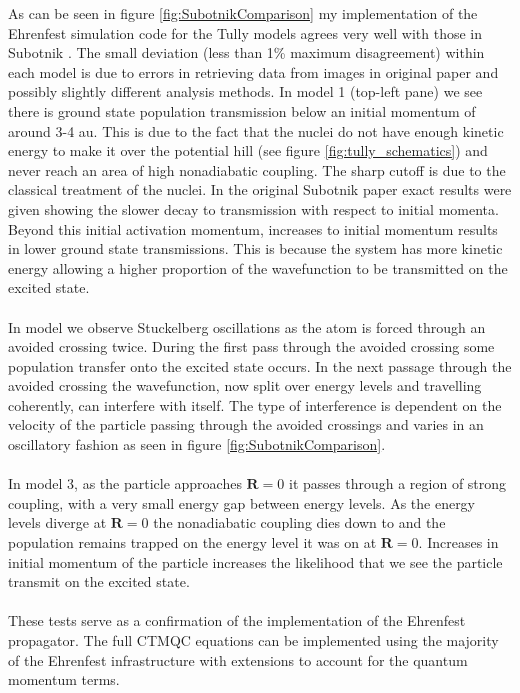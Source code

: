 As can  be seen in figure \ref{fig:SubotnikComparison} my implementation of the Ehrenfest simulation code for the Tully models agrees very well with those in Subotnik \cite{SubotnikMomentumEhrenfest}. The small deviation (less than 1\% maximum disagreement) within each model is due to errors in retrieving data from images in original paper and possibly slightly different analysis methods. In model 1 (top-left pane) we see there is  ground state population transmission below an initial momentum of around 3-4 au. This is due to the fact that the nuclei do not have enough kinetic energy to make it over the potential hill (see figure \ref{fig:tully_schematics}) and never reach an area of high nonadiabatic coupling. The sharp cutoff is due to the classical treatment of the nuclei. In the original Subotnik \cite{SubotnikMomentumEhrenfest} paper exact results were given showing the slower decay to  transmission with respect to initial momenta. Beyond this initial activation momentum, increases to initial momentum results in lower ground state transmissions. This is because the system has more kinetic energy allowing a higher proportion of the wavefunction to be transmitted on the excited state.
\\\\
In model  we observe St\:uckelberg oscillations as the atom is forced through an avoided crossing twice. During the first pass through the avoided crossing some population transfer onto the excited state occurs. In the next passage through the avoided crossing the wavefunction, now split over  energy levels and travelling coherently, can interfere with itself. The type of interference is dependent on the velocity of the particle passing through the avoided crossings and varies in an oscillatory fashion as seen in figure \ref{fig:SubotnikComparison}.
\\\\
In model 3, as the particle approaches $\mathbf{R}=0$ it passes through a region of strong coupling, with a very small energy gap between energy levels. As the  energy levels diverge at $\mathbf{R}=0$ the nonadiabatic coupling dies down to  and the population remains trapped on the energy level it was on at $\mathbf{R}=0$. Increases in initial momentum of the particle increases the likelihood that we see the particle transmit on the excited state.
\\\\
These tests serve as a confirmation of the implementation of the Ehrenfest propagator. The full CTMQC equations can be implemented using the majority of the Ehrenfest infrastructure with extensions to account for the quantum momentum terms.

